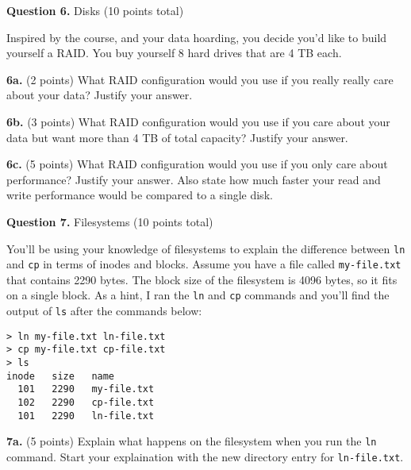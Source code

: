 \documentclass[12pt]{article}
\begin{document}
\newpage

\textbf{Question 6.} Disks (10 points total)

\vspace{1em}

Inspired by the course, and your data hoarding, you decide you'd like to build
yourself a RAID.
You buy yourself 8 hard drives that are 4 TB each.

\vspace{1em}

\textbf{6a.} (2 points)
What RAID configuration would you use if you really really care about your data?
Justify your answer.

\vspace{11em}

\textbf{6b.} (3 points)
What RAID configuration would you use if you care about your data but want more
than 4 TB of total capacity?
Justify your answer.

\vspace{16em}

\textbf{6c.} (5 points)
What RAID configuration would you use if you only care about performance?
Justify your answer.
Also state how much faster your read and write performance would be compared to
a single disk.

\newpage

\textbf{Question 7.} Filesystems (10 points total)

\vspace{1em}

You'll be using your knowledge of filesystems to explain the difference between
\texttt{ln} and \texttt{cp} in terms of inodes and blocks.
Assume you have a file called \texttt{my-file.txt} that contains 2290 bytes.
The block size of the filesystem is 4096 bytes, so it fits on a single block.
As a hint, I ran the \texttt{ln} and \texttt{cp} commands and you'll find the
output of \texttt{ls} after the commands below:

\vspace{1em}

\begin{lstlisting}
> ln my-file.txt ln-file.txt
> cp my-file.txt cp-file.txt
> ls
inode   size   name
  101   2290   my-file.txt
  102   2290   cp-file.txt
  101   2290   ln-file.txt
\end{lstlisting}

\vspace{1em}

\textbf{7a.} (5 points)
Explain what happens on the filesystem when you run the \texttt{ln} command.
Start your explaination with the new directory entry for \texttt{ln-file.txt}.
\end{document}
